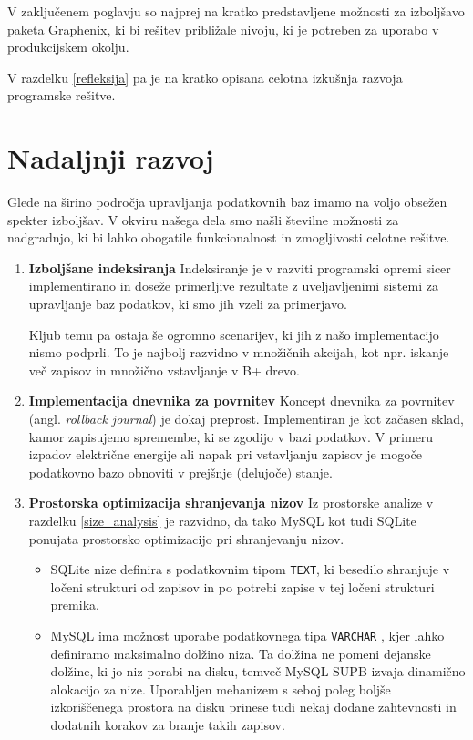 \documentclass[a4paper,12pt,openright]{book}
\begin{document}
    V zaključenem poglavju so najprej na kratko predstavljene možnosti za izboljšavo paketa Graphenix, ki bi rešitev približale nivoju, ki je potreben za uporabo v produkcijskem okolju.

    V razdelku \ref{refleksija} pa je na kratko opisana celotna izkušnja razvoja programske rešitve.
    
    \section{Nadaljnji razvoj}

    Glede na širino področja upravljanja podatkovnih baz imamo na voljo obsežen spekter izboljšav. V okviru našega dela smo našli številne možnosti za nadgradnjo, ki bi lahko obogatile funkcionalnost in zmogljivosti celotne rešitve.
    
    \begin{enumerate}
        \item \textbf{Izboljšane indeksiranja}
        \newline
        \noindent
        Indeksiranje je v razviti programski opremi sicer implementirano in doseže primerljive rezultate z uveljavljenimi sistemi za upravljanje baz podatkov, ki smo jih vzeli za primerjavo.

        Kljub temu pa ostaja še ogromno scenarijev, ki jih z našo implementacijo nismo podprli. To je najbolj razvidno v množičnih akcijah, kot npr. iskanje več zapisov in množično vstavljanje v B+ drevo.

        \newpage
        \item \textbf{Implementacija dnevnika za povrnitev}
        \newline
        \noindent
        Koncept dnevnika za povrnitev (angl. \textit{rollback journal}) je dokaj preprost. Implementiran je kot začasen sklad, kamor zapisujemo spremembe, ki se zgodijo v bazi podatkov. V primeru izpadov električne energije ali napak pri vstavljanju zapisov je mogoče podatkovno bazo obnoviti v prejšnje (delujoče) stanje.

        \item \textbf{Prostorska optimizacija shranjevanja nizov}
        \newline
        \noindent
        Iz prostorske analize v razdelku \ref{size_analysis} je razvidno, da tako MySQL kot tudi SQLite ponujata prostorsko optimizacijo pri shranjevanju nizov.
        \begin{itemize}
            \item SQLite nize definira s podatkovnim tipom {\tt TEXT}, ki besedilo shranjuje v ločeni strukturi od zapisov in po potrebi zapise v tej ločeni strukturi premika.
            \item MySQL ima možnost uporabe podatkovnega tipa {\tt VARCHAR} \cite{MYSQL_VARCHAR}, kjer lahko definiramo maksimalno dolžino niza. Ta dolžina ne pomeni dejanske dolžine, ki jo niz porabi na disku, temveč MySQL SUPB izvaja dinamično alokacijo za nize. Uporabljen mehanizem s seboj poleg boljše izkoriščenega prostora na disku prinese tudi nekaj dodane zahtevnosti in dodatnih korakov za branje takih zapisov.
        \end{itemize}
    \end{enumerate}
    
\end{document}
